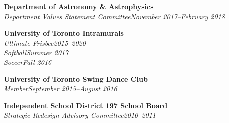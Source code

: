 \documentclass[10pt]{res} %
\begin{document}
\begin{resume}
\textbf{Department of Astronomy \& Astrophysics}\\
{\sl Department Values Statement Committee}\hfill{\sl November 2017--February 2018}

\textbf{University of Toronto Intramurals}\\
{\sl Ultimate Frisbee}\hfill{\sl 2015--2020}\\
{\sl Softball}\hfill{\sl Summer 2017}\\
{\sl Soccer}\hfill{\sl Fall 2016}

\textbf{University of Toronto Swing Dance Club}\\
{\sl Member}\hfill{\sl September 2015--August 2016}

\textbf{Independent School District 197 School Board}\\
{\sl Strategic Redesign Advisory Committee}\hfill{\sl 2010--2011}


\end{resume}
\end{document}
